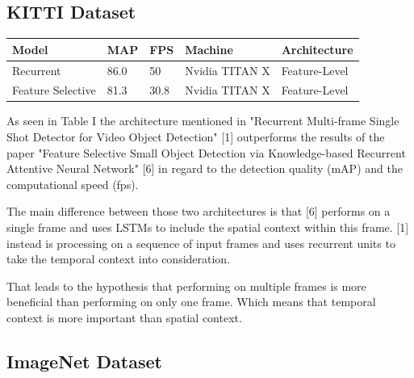 \documentclass[conference]{IEEEtran}
\begin{document}
\subsection{KITTI Dataset}
\begin{tabular}{ | p{2cm} | p{2em}| p{2em} | p{4em} | p{5em} | } 
 \hline
 Model & MAP & FPS & Machine & Architecture \\
 \hline
 Recurrent \cite{b1} & 86.0 & 50 & Nvidia TITAN X & Feature-Level \\
 \hline
 Feature Selective \cite{b6} & 81.3 & 30.8 & Nvidia TITAN X & Feature-Level \\
 \hline
\end{tabular} \newline

As seen in Table I the architecture mentioned in "Recurrent Multi-frame Single Shot Detector for Video Object Detection" [1] outperforms the results of the paper "Feature Selective Small Object Detection via Knowledge-based Recurrent Attentive Neural Network" [6] in regard to the detection quality (mAP) and the computational speed (fps). \newline

The main difference between those two architectures is that [6] performs on a single frame and uses LSTMs to include the spatial context within this frame. [1] instead is processing on a sequence of input frames and uses recurrent units to take the temporal context into consideration. \newline

That leads to the hypothesis that performing on multiple frames is more beneficial than performing on only one frame. Which means that temporal context is more important than spatial context.   

\subsection{ImageNet Dataset}
\end{document}
